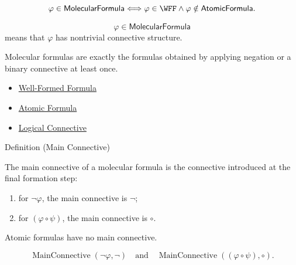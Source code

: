 \begin{remark*}
\[
\varphi\in\mathsf{MolecularFormula}
\Longleftrightarrow
\varphi\in\WFF\land\varphi\notin\mathsf{AtomicFormula}.
\]
\end{remark*}

\begin{remark*}
\[
  \varphi\in\mathsf{MolecularFormula}
\] means that \(\varphi\) has nontrivial connective structure.
\end{remark*}

\begin{remark*}[Interpretation]
Molecular formulas are exactly the formulas obtained by applying negation or a binary connective at least once.
\end{remark*}

\begin{dependencies}
\begin{itemize}
  \item \hyperref[def:well-formed-formula]{Well-Formed Formula}
  \item \hyperref[def:atomic-formula-propositional-logic]{Atomic Formula}
  \item \hyperref[def:logical-connective]{Logical Connective}
\end{itemize}
\end{dependencies}
\begin{definitionbox}{Definition (Main Connective)}
\begin{definition}
\label{def:main-connective-propositional-logic}
The main connective of a molecular formula is the connective introduced at the final formation step:
\begin{enumerate}
\item for \(\neg\varphi\), the main connective is \(\neg\);
\item for \((\varphi\circ\psi)\), the main connective is \(\circ\).
\end{enumerate}
Atomic formulas have no main connective.
\end{definition}
\end{definitionbox}

\begin{remark*}
\[
\operatorname{MainConnective}(\neg\varphi,\neg)
\quad\text{and}\quad
\operatorname{MainConnective}((\varphi\circ\psi),\circ).
\]
\end{remark*}

